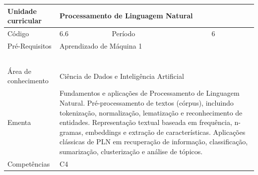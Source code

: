 \clearpage
\newpage

\begin{quadro}[ht!]
  \centering\scriptsize
\caption{Unidade Curricular Processamento de Linguagem Natural}

\begin{tabular}{|p{2.5cm}|p{2.5cm}|p{2.5cm}|p{2.5cm}|p{2.5cm}|}\hline

  Unidade curricular & \multicolumn{4}{p{10cm}|}{ Processamento de Linguagem Natural }\\\hline
  Código & 6.6 & Período & \multicolumn{2}{p{5cm}|}{ 6 }\\\hline
  Pré-Requisitos & \multicolumn{4}{p{10cm}|}{ Aprendizado de Máquina 1 } \\\hline
  \cellcolor{blue1}{ CH PRESENCIAL } &
    \cellcolor{blue1}{CH EAD Síncrona} &
    \cellcolor{blue1}{CH EAD Síncrona Mediada} &
    \cellcolor{blue1}{CH EAD Assíncrona} &
    \cellcolor{blue1}{CH APCC} \\\hline
  \cellcolor{blue1}{ 60 } &
    \cellcolor{blue1}{ 0 } &
    \cellcolor{blue1}{ 0 } &
    \cellcolor{blue1}{ 0 } &
    \cellcolor{blue1}{0} \\\hline
  \cellcolor{blue1}{ CH Teórica } &
    \cellcolor{blue1}{CH Prática} &
    \cellcolor{blue1}{CH Humanidades} &
    \cellcolor{blue1}{CH Extensão} &
    \cellcolor{blue1}{CH EAD TOTAL} \\\hline
  \cellcolor{blue1}{ 30 } &
    \cellcolor{blue1}{ 30 } &
    \cellcolor{blue1}{ 0 } &
    \cellcolor{blue1}{ 0 } &
    \cellcolor{blue1}{ 0 } \\\hline
  \cellcolor{blue1}{CARGA-HORÁRIA TOTAL} & \multicolumn{4}{p{10cm}|}{ \cellcolor{blue1}{ 60 } } \\\hline
  Área de conhecimento & \multicolumn{4}{p{10cm}|}{ Ciência de Dados e Inteligência Artificial } \\\hline
  Ementa & \multicolumn{4}{p{10cm}|}{ Fundamentos e aplicações de Processamento de Linguagem Natural. Pré-processamento de textos (córpus), incluindo tokenização, normalização, lematização e reconhecimento de entidades. Representação textual baseada em frequência, n-gramas, embeddings e extração de características. Aplicações clássicas de PLN em recuperação de informação, classificação, sumarização, clusterização e análise de tópicos. } \\\hline
  Competências & \multicolumn{4}{p{10cm}|}{ C4 } \\\hline


  
	\end{tabular}

\end{quadro}


